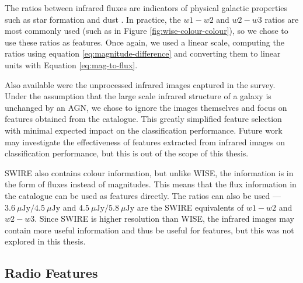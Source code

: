     The ratios between infrared fluxes are indicators of physical galactic
    properties such as star formation and dust . In practice, the $w1 - w2$ and $w2 - w3$
    ratios are most commonly used (such as in Figure
    \ref{fig:wise-colour-colour}), so we chose to use these ratios as features.
    Once again, we used a linear scale, computing the ratios using equation
    \ref{eq:magnitude-difference} and converting them to linear units with
    Equation \ref{eq:mag-to-flux}.

    Also available were the unprocessed infrared images captured in the survey.
    Under the assumption that the large scale infrared structure of a galaxy is
    unchanged by an AGN, we chose to ignore the images themselves and focus on
    features obtained from the catalogue. This greatly simplified feature
    selection with minimal expected impact on the classification performance.
    Future work may investigate the effectiveness of features extracted from
    infrared images on classification performance, but this is out of the scope
    of this thesis.

    SWIRE also contains colour information, but unlike WISE, the information is
    in the form of fluxes instead of magnitudes. This means that the flux
    information in the catalogue can be used as features directly. The ratios
    can also be used --- $3.6\ \mu\text{Jy} / 4.5\ \mu\text{Jy}$ and $4.5\
    \mu\text{Jy} / 5.8\ \mu\text{Jy}$ are the SWIRE equivalents of $w1 - w2$ and
    $w2 - w3$. Since SWIRE is higher resolution than WISE, the
    infrared images may contain more useful information and thus be useful for
    features, but this was not explored in this thesis.



  \subsection{Radio Features}
  \label{sec:radio-features}

